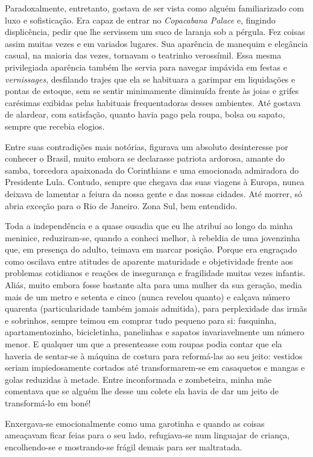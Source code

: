Paradoxalmente, entretanto, gostava de ser vista como alguém familiarizado com luxo e sofisticação.
Era capaz de entrar no \textit{Copacabana Palace} e, fingindo displicência, pedir que lhe servissem um suco de laranja sob a pérgula.
Fez coisas assim muitas vezes e em variados lugares.
Sua aparência de manequim e elegância casual, na maioria das vezes, tornavam o teatrinho verossímil.
Essa mesma privilegiada aparência também lhe servia para navegar impávida em festas e \textit{vernissages}, desfilando trajes que ela se habituara a garimpar em liquidações e pontas de estoque, sem se sentir minimamente diminuída frente às joias e grifes carésimas exibidas pelas habituais frequentadoras desses ambientes.
Até gostava de alardear, com satisfação, quanto havia pago pela roupa, bolsa ou sapato, sempre que recebia elogios.


Entre suas contradições mais notórias, figurava um absoluto desinteresse por conhecer o Brasil, muito embora se declarasse patriota ardorosa, amante do samba, torcedora apaixonada do Corinthians e uma emocionada admiradora do Presidente Lula.
Contudo, sempre que chegava das suas viagens à Europa, nunca deixava de lamentar a feiura da nossa gente e das nossas cidades.
Até morrer, só abria exceção para o Rio de Janeiro.
Zona Sul, bem entendido.

Toda a independência e a quase ousadia que eu lhe atribuí ao longo da minha meninice, reduziram-se, quando a conheci melhor, à rebeldia de uma jovenzinha que, em presença do adulto, teimava em marcar posição.
Porque era engraçado como oscilava entre atitudes de aparente maturidade e objetividade frente aos problemas cotidianos e reações de insegurança e fragilidade muitas vezes infantis.
Aliás, muito embora fosse bastante alta para uma mulher da sua geração, media mais de um metro e setenta e cinco (nunca revelou quanto) e calçava número quarenta (particularidade também jamais admitida), para perplexidade das irmãs e sobrinhos, sempre teimou em comprar tudo pequeno para si: fusquinha, apartamentozinho, bicicletinha, panelinhas e sapatos invariavelmente um número menor.
E qualquer um que a presenteasse com roupas podia contar que ela haveria de sentar-se à máquina de costura para reformá-las ao seu jeito: vestidos seriam impiedosamente cortados até transformarem-se em casaquetos e mangas e golas reduzidas à metade.
Entre inconformada e zombeteira, minha mãe comentava que se alguém lhe desse um colete ela havia de dar um jeito de transformá-lo em boné! 

Enxergava-se emocionalmente como uma garotinha e quando as coisas ameaçavam ficar feias para o seu lado, refugiava-se num linguajar de criança, encolhendo-se e mostrando-se frágil demais para ser maltratada.

